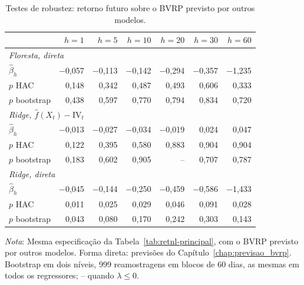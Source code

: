 \begin{table}[H]
\centering
\small
\caption{Testes de robustez: retorno futuro sobre o BVRP previsto por outros modelos.}
\label{tab:retnl-robustez}
\begin{tabular}{lrrrrrr}
\toprule
 & $h = 1$ & $h = 5$ & $h = 10$ & $h = 20$ & $h = 30$ & $h = 60$ \\
\midrule
\multicolumn{7}{l}{\textit{Floresta, direta}} \\
\quad $\hat\beta_h$ & $-$0{,}057 & $-$0{,}113 & $-$0{,}142 & $-$0{,}294 & $-$0{,}357 & $-$1{,}235 \\
\quad $p$ HAC & 0{,}148 & 0{,}342 & 0{,}487 & 0{,}493 & 0{,}606 & 0{,}333 \\
\quad $p$ bootstrap & 0{,}438 & 0{,}597 & 0{,}770 & 0{,}794 & 0{,}834 & 0{,}720 \\
\multicolumn{7}{l}{\textit{Ridge, $\hat f(X_t) - \text{IV}_t$}} \\
\quad $\hat\beta_h$ & $-$0{,}013 & $-$0{,}027 & $-$0{,}034 & $-$0{,}019 & 0{,}024 & 0{,}047 \\
\quad $p$ HAC & 0{,}122 & 0{,}395 & 0{,}580 & 0{,}883 & 0{,}904 & 0{,}904 \\
\quad $p$ bootstrap & 0{,}183 & 0{,}602 & 0{,}905 & -- & 0{,}707 & 0{,}787 \\
\multicolumn{7}{l}{\textit{Ridge, direta}} \\
\quad $\hat\beta_h$ & $-$0{,}045 & $-$0{,}144 & $-$0{,}250 & $-$0{,}459 & $-$0{,}586 & $-$1{,}433 \\
\quad $p$ HAC & 0{,}011 & 0{,}025 & 0{,}029 & 0{,}046 & 0{,}091 & 0{,}028 \\
\quad $p$ bootstrap & 0{,}043 & 0{,}080 & 0{,}170 & 0{,}242 & 0{,}303 & 0{,}143 \\
\bottomrule
\end{tabular}
\par\smallskip
\parbox{0.95\linewidth}{\footnotesize\textit{Nota}: Mesma especificação da Tabela~\ref{tab:retnl-principal}, com o BVRP previsto por outros modelos. Forma direta: previsões do Capítulo~\ref{chap:previsao_bvrp}. Bootstrap em dois níveis, 999 reamostragens em blocos de 60 dias, as mesmas em todos os regressores; -- quando $\lambda \le 0$.}
\end{table}
